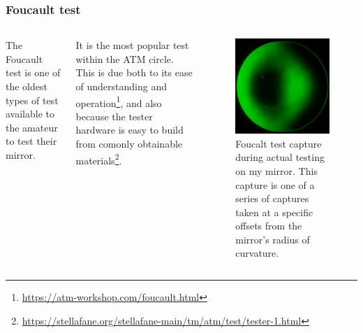 \documentclass{beamer}
\begin{document}
\begin{frame}
\frametitle{Foucault test}
\begin{columns}
The Foucault test is one of the oldest types of test available to the amateur to test their mirror.

It is the most popular test within the ATM circle. This is due both to its ease of understanding and operation\footnote[frame]{\url{https://atm-workshop.com/foucault.html}}, and also because the tester hardware is easy to build from comonly obtainable materials\footnote[frame]{\url{https://stellafane.org/stellafane-main/tm/atm/test/tester-1.html}}.
\begin{figure}
\includegraphics[scale=0.3]{assets/Foucault.jpg}
\caption{Foucalt test capture during actual testing on my mirror. This capture is one of a series of captures taken at a specific offsets from the mirror's radius of curvature.}
\end{figure}
\end{columns}
\end{frame}
\end{document}
